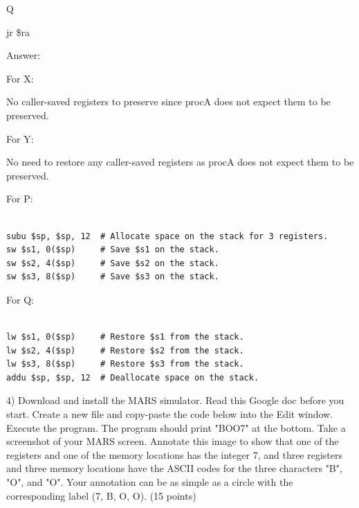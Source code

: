 \documentclass{article}
\begin{document}
    Q

    jr \$ra


Answer:

For X:

No caller-saved registers to preserve since procA
does not expect them to be preserved.

For Y:

No need to restore any caller-saved registers as procA
does not expect them to be preserved.

For P:

\begin{lstlisting}[language={[x86masm]Assembler}]

subu $sp, $sp, 12  # Allocate space on the stack for 3 registers.
sw $s1, 0($sp)     # Save $s1 on the stack.
sw $s2, 4($sp)     # Save $s2 on the stack.
sw $s3, 8($sp)     # Save $s3 on the stack.

\end{lstlisting}

For Q:

\begin{lstlisting}[language={[x86masm]Assembler}]

lw $s1, 0($sp)     # Restore $s1 from the stack.
lw $s2, 4($sp)     # Restore $s2 from the stack.
lw $s3, 8($sp)     # Restore $s3 from the stack.
addu $sp, $sp, 12  # Deallocate space on the stack.

\end{lstlisting}


\newpage

4) Download and install the MARS simulator. Read this Google doc before you start.
Create a new file and copy-paste the code below into the Edit window.
Execute the program. The program should print "BOO7" at the bottom.
Take a screenshot of your MARS screen. Annotate this image to show that
one of the registers and one of the memory locations has the integer 7,
and three registers and three memory locations have the ASCII codes for
the three characters "B", "O", and "O". Your annotation can be as
simple as a circle with the corresponding label (7, B, O, O). (15 points)
\end{document}
